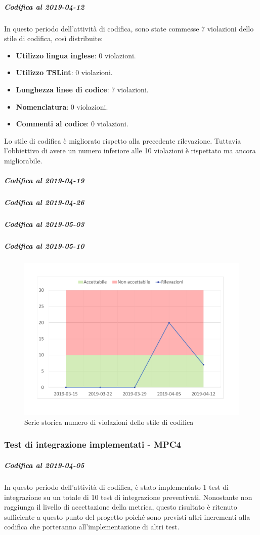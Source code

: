 \subparagraph{Codifica al 2019-04-12}
In questo periodo dell'attività di codifica, sono state commesse 7 violazioni dello stile di codifica, così distribuite:
 \begin{itemize}
 	\item \textbf{Utilizzo lingua inglese}: 0 violazioni.
 	\item \textbf{Utilizzo TSLint}: 0 violazioni.
 	\item \textbf{Lunghezza linee di codice}: 7 violazioni.
 	\item \textbf{Nomenclatura}: 0 violazioni.
 	\item \textbf{Commenti al codice}: 0 violazioni.
 \end{itemize}
Lo stile di codifica è migliorato rispetto alla precedente rilevazione. Tuttavia l'obbiettivo di avere un numero inferiore alle 10 violazioni è rispettato ma ancora migliorabile.

\subparagraph{Codifica al 2019-04-19}

\subparagraph{Codifica al 2019-04-26}

\subparagraph{Codifica al 2019-05-03}

\subparagraph{Codifica al 2019-05-10}

\begin{figure}[H]
	\centering
	\includegraphics[scale=0.6]{images/resoconto/MPC3Chart.pdf}
	\caption{Serie storica numero di violazioni dello stile di codifica}	
\end{figure}

\subsubsection{Test di integrazione implementati - MPC4}
\subparagraph{Codifica al 2019-04-05}
In questo periodo dell'attività di codifica, è stato implementato 1 test di integrazione su un totale di 10 test di integrazione preventivati.
Nonostante non raggiunga il livello di accettazione della
metrica, questo risultato è ritenuto sufficiente a questo punto del progetto poiché sono previsti altri incrementi alla codifica che porteranno all'implementazione di altri test.

